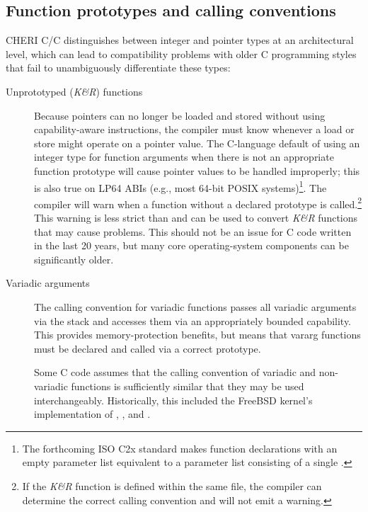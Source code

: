 \documentclass[12pt,twoside,openright,usletter]{article}
\newcommand{\ccode}[1]{{\small\ttfamily{#1}}}
\newcommand{\cfunc}[1]{{\ccode{#1()}}}
\newcommand{\commandline}[1]{{\ccode{#1}}}
\newcommand{\note}[2]{{\color{blue}[ Note: #1 - #2]}}
\renewcommand{\note}[2]{\relax\ifhmode\unskip\fi}
\newcommand{\arnote}[1]{\note{#1}{Alex R.}}
\newcommand{\rwnote}[1]{\note{#1}{Robert W.}}
\newcommand*{\cpp}[1][]{C\textsmaller[2]{\nolinebreak[4]\hspace{-.05em}\raisebox{.45ex}{\textbf{++}}}}
\begin{document}
\subsection{Function prototypes and calling conventions}

CHERI C/\cpp{} distinguishes between integer and pointer types at an
architectural level, which can lead to compatibility problems with older C
programming styles that fail to unambiguously differentiate these types:

\begin{description}
\item[Unprototyped (\textit{K\&R}) functions] Because pointers can no longer
  be loaded and stored without using capability-aware instructions, the
  compiler must know whenever a load or store might operate on a pointer
  value.
  The C-language default of using an integer type for function arguments when
  there is not an appropriate function prototype will cause pointer values to
  be handled improperly; this is also true on LP64 ABIs (e.g., most 64-bit
  POSIX systems)\footnote{The forthcoming ISO C2x standard
  makes function declarations with an empty parameter list equivalent to
  a parameter list consisting of a single \ccode{void}.}.
  The compiler will warn when a function without a declared prototype is
  called.\footnote{If the \textit{K\&R} function is defined within the same
  file, the compiler can determine the correct calling convention and will not
  emit a warning.}
  This warning is less strict than \commandline{-Wstrict-prototypes} and can be
  used to convert \textit{K\&R} functions that may cause problems.
  This should not be an issue for C code written in the last 20 years, but
  many core operating-system components can be significantly older.

\item[Variadic arguments] The calling convention for variadic functions
  passes all variadic arguments via the stack and accesses them via an
  appropriately bounded capability.
  This provides memory-protection benefits, but means that vararg functions
  must be declared and called via a correct prototype.

  Some C code assumes that the calling convention of variadic and non-variadic
  functions is sufficiently similar that they may be used interchangeably.
  Historically, this included the FreeBSD kernel's implementation of
  \cfunc{open}, \cfunc{fcntl}, and \cfunc{syscall}.

  \rwnote{I wonder if we need to be more specific with an example here.}\arnote{TODO: Add example such as missing open() mode arguments?}

\end{description}
\end{document}
